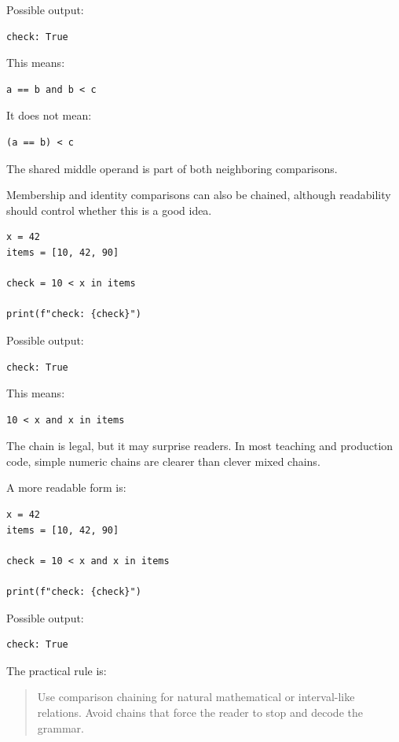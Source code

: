 \documentclass[a4paper,twoside]{report}
\begin{document}
Possible output:

\begin{verbatim}
check: True
\end{verbatim}

This means:

\begin{verbatim}
a == b and b < c
\end{verbatim}

It does not mean:

\begin{verbatim}
(a == b) < c
\end{verbatim}

The shared middle operand is part of both neighboring comparisons.

Membership and identity comparisons can also be chained, although readability should control whether this is a good idea.

\begin{verbatim}
x = 42
items = [10, 42, 90]

check = 10 < x in items

print(f"check: {check}")
\end{verbatim}

Possible output:

\begin{verbatim}
check: True
\end{verbatim}

This means:

\begin{verbatim}
10 < x and x in items
\end{verbatim}

The chain is legal, but it may surprise readers. In most teaching and production code, simple numeric chains are clearer than clever mixed chains.

A more readable form is:

\begin{verbatim}
x = 42
items = [10, 42, 90]

check = 10 < x and x in items

print(f"check: {check}")
\end{verbatim}

Possible output:

\begin{verbatim}
check: True
\end{verbatim}

The practical rule is:

\begin{quote}
Use comparison chaining for natural mathematical or interval-like relations. Avoid chains that force the reader to stop and decode the grammar.
\end{quote}
\end{document}
